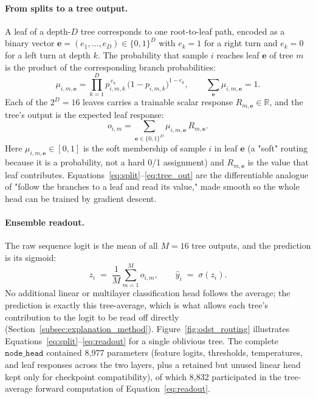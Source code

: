 \paragraph{From splits to a tree output.}
A leaf of a depth-\(D\) tree corresponds to one root-to-leaf path, encoded as
a binary vector \(\mathbf e=(e_1,\dots,e_D)\in\{0,1\}^{D}\) with \(e_k=1\)
for a right turn and \(e_k=0\) for a left turn at depth \(k\). The
probability that sample \(i\) reaches leaf \(\mathbf e\) of tree \(m\) is the
product of the corresponding branch probabilities:
\begin{equation}
\mu_{i,m,\mathbf e}
=
\prod_{k=1}^{D}
p_{i,m,k}^{\,e_k}\,
\big(1-p_{i,m,k}\big)^{1-e_k},
\qquad
\sum_{\mathbf e}\mu_{i,m,\mathbf e}=1.
\label{eq:leaf_prob}
\end{equation}
Each of the \(2^{D}=16\) leaves carries a trainable scalar response
\(R_{m,\mathbf e}\in\mathbb R\), and the tree's output is the expected leaf
response:
\begin{equation}
o_{i,m}
=
\sum_{\mathbf e\in\{0,1\}^{D}}
\mu_{i,m,\mathbf e}\,R_{m,\mathbf e}.
\label{eq:tree_out}
\end{equation}
Here \(\mu_{i,m,\mathbf e}\in[0,1]\) is the soft membership of sample \(i\)
in leaf \(\mathbf e\) (a "soft" routing because it is a probability, not a
hard 0/1 assignment) and \(R_{m,\mathbf e}\) is the value that leaf
contributes. Equations~\eqref{eq:split}--\eqref{eq:tree_out} are the
differentiable analogue of "follow the branches to a leaf and read its
value," made smooth so the whole head can be trained by gradient descent.
\paragraph{Ensemble readout.}
The raw sequence logit is the mean of all \(M=16\) tree outputs, and the
prediction is its sigmoid:
\begin{equation}
z_i \;=\; \frac{1}{M}\sum_{m=1}^{M} o_{i,m},
\qquad
\hat y_i \;=\; \sigma(z_i).
\label{eq:readout}
\end{equation}
No additional linear or multilayer classification head follows the average;
the prediction is exactly this tree-average, which is what allows each
tree's contribution to the logit to be read off directly
(Section~\ref{subsec:explanation_method}). Figure~\ref{fig:odst_routing}
illustrates Equations~\eqref{eq:split}--\eqref{eq:readout} for a single
oblivious tree.
The complete \(\texttt{node\_head}\) contained 8{,}977 parameters
(feature logits, thresholds, temperatures, and leaf responses across the two
layers, plus a retained but unused linear head kept only for checkpoint
compatibility), of which 8{,}832 participated in the tree-average forward
computation of Equation~\eqref{eq:readout}.


